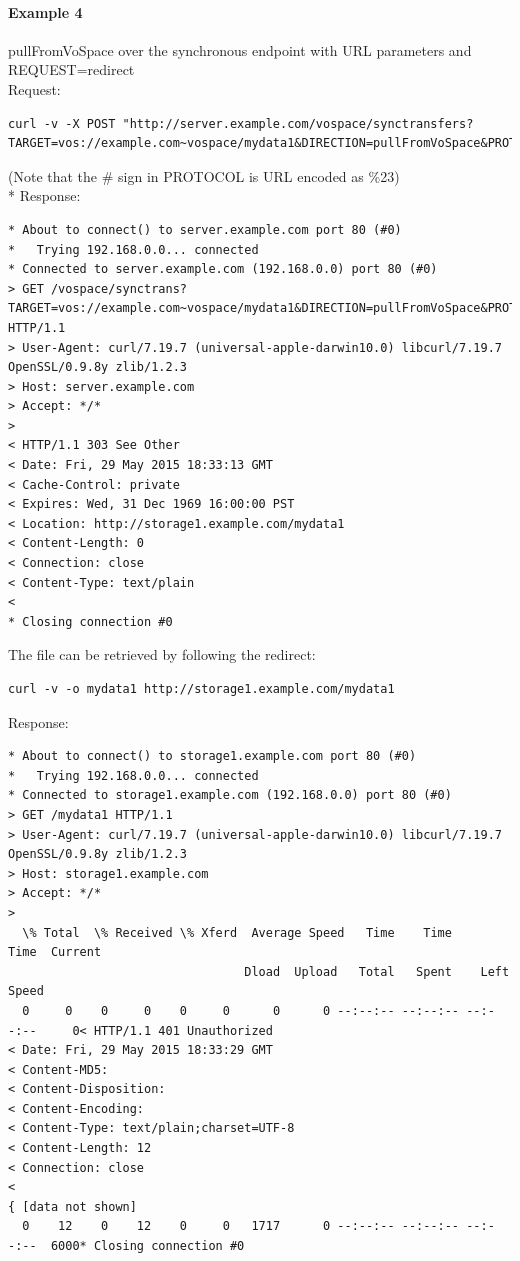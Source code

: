 \documentclass[11pt,a4paper]{ivoa}
\begin{document}
\paragraph{Example 4}
pullFromVoSpace over the synchronous endpoint with URL parameters and REQUEST=redirect
\\[5px]
\noindent
Request:
\begin{lstlisting}
curl -v -X POST "http://server.example.com/vospace/synctransfers?TARGET=vos://example.com~vospace/mydata1&DIRECTION=pullFromVoSpace&PROTOCOL=ivo://ivoa.net/vospace/core%23httpget&REQUEST=redirect"
\end{lstlisting}
(Note that the \# sign in PROTOCOL is URL encoded as \%23) \\*
Response:
\begin{lstlisting}
* About to connect() to server.example.com port 80 (#0)
*   Trying 192.168.0.0... connected
* Connected to server.example.com (192.168.0.0) port 80 (#0)
> GET /vospace/synctrans?TARGET=vos://example.com~vospace/mydata1&DIRECTION=pullFromVoSpace&PROTOCOL=ivo://ivoa.net/vospace/core\%23httpget&REQUEST=redirect HTTP/1.1
> User-Agent: curl/7.19.7 (universal-apple-darwin10.0) libcurl/7.19.7 OpenSSL/0.9.8y zlib/1.2.3
> Host: server.example.com
> Accept: */*
>
< HTTP/1.1 303 See Other
< Date: Fri, 29 May 2015 18:33:13 GMT
< Cache-Control: private
< Expires: Wed, 31 Dec 1969 16:00:00 PST
< Location: http://storage1.example.com/mydata1
< Content-Length: 0
< Connection: close
< Content-Type: text/plain
<
* Closing connection #0
\end{lstlisting}
The file can be retrieved by following the redirect:
\begin{lstlisting}
curl -v -o mydata1 http://storage1.example.com/mydata1
\end{lstlisting}
Response:
\begin{lstlisting}
* About to connect() to storage1.example.com port 80 (#0)
*   Trying 192.168.0.0... connected
* Connected to storage1.example.com (192.168.0.0) port 80 (#0)
> GET /mydata1 HTTP/1.1
> User-Agent: curl/7.19.7 (universal-apple-darwin10.0) libcurl/7.19.7 OpenSSL/0.9.8y zlib/1.2.3
> Host: storage1.example.com
> Accept: */*
>
  \% Total  \% Received \% Xferd  Average Speed   Time    Time     Time  Current
                                 Dload  Upload   Total   Spent    Left  Speed
  0     0    0     0    0     0      0      0 --:--:-- --:--:-- --:--:--     0< HTTP/1.1 401 Unauthorized
< Date: Fri, 29 May 2015 18:33:29 GMT
< Content-MD5:
< Content-Disposition:
< Content-Encoding:
< Content-Type: text/plain;charset=UTF-8
< Content-Length: 12
< Connection: close
<
{ [data not shown]
  0    12    0    12    0     0   1717      0 --:--:-- --:--:-- --:--:--  6000* Closing connection #0
\end{lstlisting}
\end{document}
